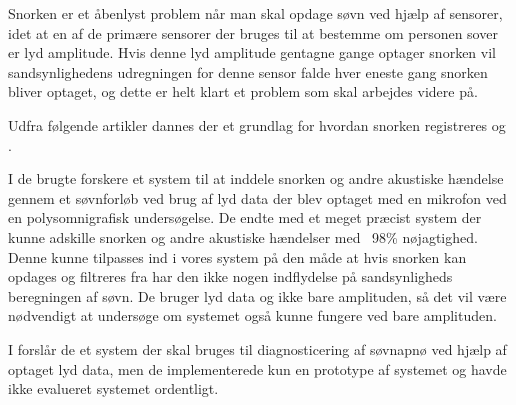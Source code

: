 Snorken er et åbenlyst problem når man skal opdage søvn ved hjælp af sensorer, idet at en af de primære sensorer der bruges til at bestemme om personen sover er lyd amplitude.
Hvis denne lyd amplitude gentagne gange optager snorken vil sandsynlighedens udregningen for denne sensor falde hver eneste gang snorken bliver optaget, og dette er helt klart et problem som skal arbejdes videre på.

Udfra følgende artikler dannes der et grundlag for hvordan snorken registreres \citep{Dafna2013} og \citep{Calabrese20111101}.

I \citep{Dafna2013} de brugte forskere et system til at inddele snorken og andre akustiske hændelse gennem et søvnforløb ved brug af lyd data der blev optaget med en mikrofon ved en polysomnigrafisk undersøgelse. 
De endte med et meget præcist system der kunne adskille snorken og andre akustiske hændelser med ~98\% nøjagtighed.
Denne kunne tilpasses ind i vores system på den måde at hvis snorken kan opdages og filtreres fra har den ikke nogen indflydelse på sandsynligheds beregningen af søvn. 
De bruger lyd data og ikke bare amplituden, så det vil være nødvendigt at undersøge om systemet også kunne fungere ved bare amplituden.

I \citep{Calabrese20111101} forslår de et system der skal bruges til diagnosticering af søvnapnø ved hjælp af optaget lyd data, men de implementerede kun en prototype af systemet og havde ikke evalueret systemet ordentligt. 